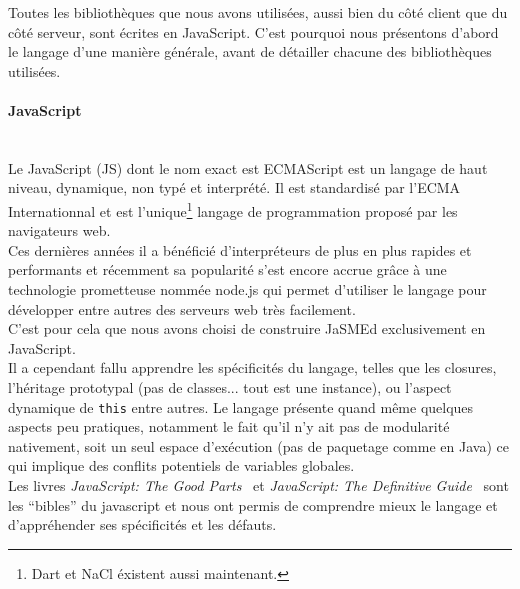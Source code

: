 \documentclass[12pt,a4paper]{article}
\begin{document}
Toutes les bibliothèques que nous avons utilisées, aussi bien du côté client que du côté serveur, sont écrites en JavaScript. C’est pourquoi nous présentons d’abord le langage d’une manière générale, avant de détailler chacune des bibliothèques utilisées.

\paragraph{JavaScript}~\\
Le JavaScript (JS) dont le nom exact est ECMAScript est un langage de haut niveau, dynamique, non typé et interprété. Il est standardisé par l’ECMA Internationnal et est l’unique\footnote{Dart et NaCl éxistent aussi maintenant.} langage de programmation proposé par les navigateurs web.\\
Ces dernières années il a bénéficié d’interpréteurs de plus en plus rapides et performants et récemment sa popularité s’est encore accrue grâce à une technologie prometteuse nommée node.js qui permet d’utiliser le langage pour développer entre autres des serveurs web très facilement.\\
C’est pour cela que nous avons choisi de construire JaSMEd exclusivement en JavaScript.\\
Il a cependant fallu apprendre les spécificités du langage, telles que les closures, l’héritage prototypal (pas de classes... tout est une instance), ou l’aspect dynamique de \texttt{this} entre autres. Le langage présente quand même quelques aspects peu pratiques, notamment le fait qu’il n’y ait pas de modularité nativement, soit un seul espace d’exécution (pas de paquetage comme en Java) ce qui implique des conflits potentiels de variables globales.\\
Les livres \emph{JavaScript: The Good Parts}~\cite{Crockford} et \emph{JavaScript: The Definitive Guide}~\cite{Flanagan} sont les “bibles” du javascript et nous ont permis de comprendre mieux le langage et d’appréhender ses spécificités et les défauts.
\end{document}
